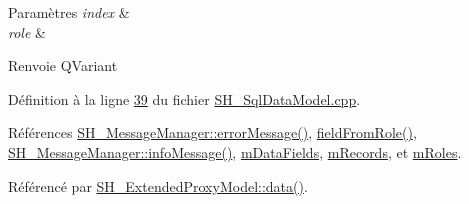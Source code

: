 \begin{DoxyParams}{Paramètres}
{\em index} & \\
\hline
{\em role} & \\
\hline
\end{DoxyParams}
\begin{DoxyReturn}{Renvoie}
Q\-Variant 
\end{DoxyReturn}


Définition à la ligne \hyperlink{SH__SqlDataModel_8cpp_source_l00039}{39} du fichier \hyperlink{SH__SqlDataModel_8cpp_source}{S\-H\-\_\-\-Sql\-Data\-Model.\-cpp}.



Références \hyperlink{classSH__MessageManager_a0cb4f06cf67539457482ba1c8544eb06}{S\-H\-\_\-\-Message\-Manager\-::error\-Message()}, \hyperlink{classSH__SqlDataModel_a3c6539114dd06aa8043e7a4e9762f6f4}{field\-From\-Role()}, \hyperlink{classSH__MessageManager_a0b35c2f96e6d69934bf7f7c1e2172ea9}{S\-H\-\_\-\-Message\-Manager\-::info\-Message()}, \hyperlink{classSH__SqlDataModel_a3e998f75dd5b3193783612002461888d}{m\-Data\-Fields}, \hyperlink{classSH__SqlDataModel_aa58096989daac3cd3fdea5e6dd4f27ee}{m\-Records}, et \hyperlink{classSH__SqlDataModel_ad1e46c72a6aeb83e3e7bb0c3110d12a4}{m\-Roles}.



Référencé par \hyperlink{classSH__ExtendedProxyModel_afbc947efbe1107fc5bf8926c52902a1c}{S\-H\-\_\-\-Extended\-Proxy\-Model\-::data()}.


